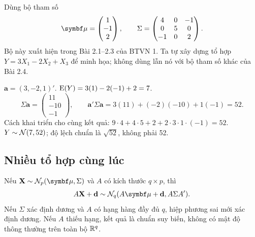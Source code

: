 \begin{example}
Dùng bộ tham số
\begin{equation}
 \vmu=\begin{pmatrix}1\\-1\\2\end{pmatrix},\qquad
 \Sigma=\begin{pmatrix}4&0&-1\\0&5&0\\-1&0&2\end{pmatrix}.
 \label{eq:running3d}
\end{equation}
Bộ này xuất hiện trong Bài 2.1--2.3 của BTVN 1. Ta tự xây dựng tổ hợp
$Y=3X_1-2X_2+X_3$ để minh họa; không dùng lẫn nó với bộ tham số khác của Bài 2.4.

$\mathbf a=(3,-2,1)'$.
$\operatorname{E}(Y)=3(1)-2(-1)+2=7$.
\[
 \Sigma\mathbf a=\begin{pmatrix}11\\-10\\-1\end{pmatrix},\qquad
 \mathbf a'\Sigma\mathbf a=3(11)+(-2)(-10)+1(-1)=52.
\]
Cách khai triển cho cùng kết quả:
$9\cdot4+4\cdot5+2+2\cdot3\cdot1\cdot(-1)=52$.
$Y\sim\mathcal N(7,52)$; độ lệch chuẩn là $\sqrt{52}$, không phải 52.
\end{example}

\subsection{Nhiều tổ hợp cùng lúc}
\begin{result}
Nếu $\mathbf X\sim\N_p(\vmu,\Sigma)$ và $A$ có kích thước $q\times p$,
thì
\begin{equation}
 A\mathbf X+\mathbf d\sim\N_q(A\vmu+\mathbf d,A\Sigma A').
 \label{eq:multilinear}
\end{equation}
Nếu $\Sigma$ xác định dương và $A$ có hạng hàng đầy đủ $q$, hiệp phương
sai mới xác định dương. Nếu $A$ thiếu hạng, kết quả là chuẩn suy biến,
không có mật độ thông thường trên toàn bộ $\mathbb R^q$.
\end{result}

